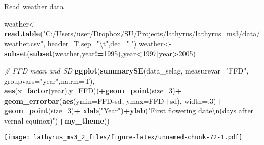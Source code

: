 \documentclass[
]{article}
\newenvironment{Shaded}{\begin{snugshade}}{\end{snugshade}}
\newcommand{\CharTok}[1]{\textcolor[rgb]{0.31,0.60,0.02}{#1}}
\newcommand{\CommentTok}[1]{\textcolor[rgb]{0.56,0.35,0.01}{\textit{#1}}}
\newcommand{\DataTypeTok}[1]{\textcolor[rgb]{0.13,0.29,0.53}{#1}}
\newcommand{\DecValTok}[1]{\textcolor[rgb]{0.00,0.00,0.81}{#1}}
\newcommand{\KeywordTok}[1]{\textcolor[rgb]{0.13,0.29,0.53}{\textbf{#1}}}
\newcommand{\NormalTok}[1]{#1}
\newcommand{\OperatorTok}[1]{\textcolor[rgb]{0.81,0.36,0.00}{\textbf{#1}}}
\newcommand{\StringTok}[1]{\textcolor[rgb]{0.31,0.60,0.02}{#1}}
\begin{document}
Read weather data

\begin{Shaded}
\begin{Highlighting}[]
\NormalTok{weather<-}\KeywordTok{read.table}\NormalTok{(}\StringTok{"C:/Users/user/Dropbox/SU/Projects/lathyrus/lathyrus_ms3/data/weather.csv"}\NormalTok{,}
                    \DataTypeTok{header=}\NormalTok{T,}\DataTypeTok{sep=}\StringTok{"}\CharTok{\textbackslash{}t}\StringTok{"}\NormalTok{,}\DataTypeTok{dec=}\StringTok{"."}\NormalTok{) }
\NormalTok{weather<-}\KeywordTok{subset}\NormalTok{(}\KeywordTok{subset}\NormalTok{(weather,year}\OperatorTok{!=}\DecValTok{1995}\NormalTok{),year}\OperatorTok{<}\DecValTok{1997}\OperatorTok{|}\NormalTok{year}\OperatorTok{>}\DecValTok{2005}\NormalTok{)}
\end{Highlighting}
\end{Shaded}

\begin{Shaded}
\begin{Highlighting}[]
\CommentTok{# FFD mean and SD}
\KeywordTok{ggplot}\NormalTok{(}\KeywordTok{summarySE}\NormalTok{(data_selag, }\DataTypeTok{measurevar=}\StringTok{"FFD"}\NormalTok{, }\DataTypeTok{groupvars=}\StringTok{"year"}\NormalTok{,}\DataTypeTok{na.rm=}\NormalTok{T),}
       \KeywordTok{aes}\NormalTok{(}\DataTypeTok{x=}\KeywordTok{factor}\NormalTok{(year),}\DataTypeTok{y=}\NormalTok{FFD))}\OperatorTok{+}\KeywordTok{geom_point}\NormalTok{(}\DataTypeTok{size=}\DecValTok{3}\NormalTok{)}\OperatorTok{+}
\StringTok{  }\KeywordTok{geom_errorbar}\NormalTok{(}\KeywordTok{aes}\NormalTok{(}\DataTypeTok{ymin=}\NormalTok{FFD}\OperatorTok{-}\NormalTok{sd, }\DataTypeTok{ymax=}\NormalTok{FFD}\OperatorTok{+}\NormalTok{sd), }\DataTypeTok{width=}\NormalTok{.}\DecValTok{3}\NormalTok{)}\OperatorTok{+}\StringTok{ }\KeywordTok{geom_point}\NormalTok{(}\DataTypeTok{size=}\DecValTok{3}\NormalTok{)}\OperatorTok{+}
\StringTok{  }\KeywordTok{xlab}\NormalTok{(}\StringTok{"Year"}\NormalTok{)}\OperatorTok{+}\KeywordTok{ylab}\NormalTok{(}\StringTok{"First flowering date}\CharTok{\textbackslash{}n}\StringTok{(days after vernal equinox)"}\NormalTok{)}\OperatorTok{+}\KeywordTok{my_theme}\NormalTok{()}
\end{Highlighting}
\end{Shaded}

\texttt{[image: lathyrus\_ms3\_2\_files/figure-latex/unnamed-chunk-72-1.pdf]}
\end{document}

